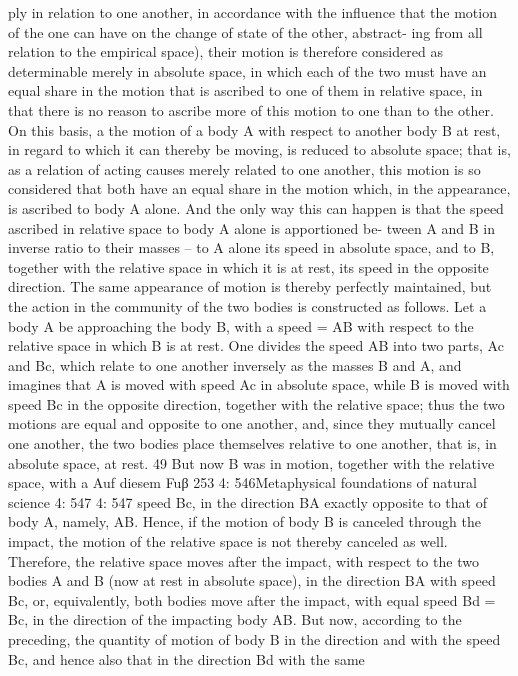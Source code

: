 ply in relation to one another, in accordance with the inﬂuence that the
motion of the one can have on the change of state of the other, abstract-
ing from all relation to the empirical space), their motion is therefore
considered as determinable merely in absolute space, in which each of
the two must have an equal share in the motion that is ascribed to one
of them in relative space, in that there is no reason to ascribe more of
this motion to one than to the other. On this basis, a the motion of a
body A with respect to another body B at rest, in regard to which it can
thereby be moving, is reduced to absolute space; that is, as a relation of
acting causes merely related to one another, this motion is so considered
that both have an equal share in the motion which, in the appearance,
is ascribed to body A alone. And the only way this can happen is that
the speed ascribed in relative space to body A alone is apportioned be-
tween A and B in inverse ratio to their masses – to A alone its speed in
absolute space, and to B, together with the relative space in which it is at
rest, its speed in the opposite direction. The same appearance of motion
is thereby perfectly maintained, but the action in the community of the
two bodies is constructed as follows.
Let a body A be approaching the body B, with a speed = AB with respect
to the relative space in which B is at rest. One divides the speed AB into
two parts, Ac and Bc, which relate to one another inversely as the masses
B and A, and imagines that A is moved with speed Ac in absolute space,
while B is moved with speed Bc in the opposite direction, together with
the relative space; thus the two motions are equal and opposite to one
another, and, since they mutually cancel one another, the two bodies
place themselves relative to one another, that is, in absolute space, at
rest. 49 But now B was in motion, together with the relative space, with
a
Auf diesem Fuβ
253
4: 546Metaphysical foundations of natural science
4: 547
4: 547
speed Bc, in the direction BA exactly opposite to that of body A, namely,
AB. Hence, if the motion of body B is canceled through the impact, the
motion of the relative space is not thereby canceled as well. Therefore,
the relative space moves after the impact, with respect to the two bodies
A and B (now at rest in absolute space), in the direction BA with speed
Bc, or, equivalently, both bodies move after the impact, with equal speed
Bd = Bc, in the direction of the impacting body AB. But now, according
to the preceding, the quantity of motion of body B in the direction and
with the speed Bc, and hence also that in the direction Bd with the same
